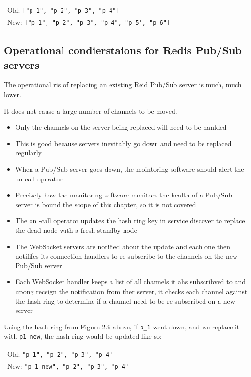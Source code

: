 \documentclass{report}
\theoremstyle{definition}
\let\oldsubsection\subsection
\renewcommand{\subsection}{\oldsubsection*}
\begin{document}
\begin{tabular}{|p{8cm}|}
\hline
Old: \lstinline|["p_1", "p_2", "p_3", "p_4"]| \\
New: \lstinline|["p_1", "p_2", "p_3", "p_4", "p_5", "p_6"]| \\
\hline
\end{tabular}

\subsection{Operational condierstaions for Redis Pub/Sub servers}

The operational ris of replacing an existing Reid Pub/Sub server is much, much lower.

It does not cause a large number of channels to be moved.

\begin{itemize}
\item
Only the channels on the server being replaced will need to be hanlded
\item
This is good because servers inevitably go down and need to be replaced regularly
\item
When a Pub/Sub server goes down, the mointoring software should alert the on-call operator
\item
Precisely how the monitoring software monitors the health of a Pub/Sub server is bound the scope of this chapter, so it is not covered
\item
The on -call operator updates the hash ring key in service discover to replace the dead node with a fresh standby node
\item
The WebSocket servers are notified about the update and each one then notififes its connection handlers to re-subscribe to the channels on the new Pub/Sub server
\item
Each WebSocket handler keeps a list of all channels it ahs subscribved to and upong receign the notification from ther server, it checks each channel against the hash ring to determine if a channel need to be re-subscribed on a new server
\end{itemize}

Using the hash ring from Figure 2.9 above, if \lstinline|p_1| went down, and we replace it with \lstinline|p1_new|, the hash ring
would be updated like so:

\begin{tabular}{|p{8cm}|}
\hline
Old:  \lstinline|"p_1", "p_2", "p_3", "p_4"| \\
New:  \lstinline|"p_1_new", "p_2", "p_3", "p_4"| \\
\hline
\end{tabular}
\end{document}
